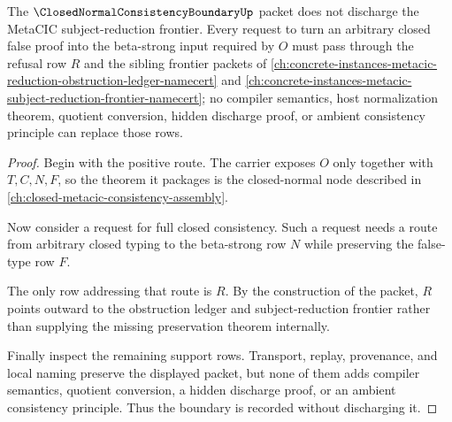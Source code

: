 \begin{theorem}
\label{thm:closed-normal-consistency-boundary-non-discharge}
The $\ClosedNormalConsistencyBoundaryUp$ packet does not discharge the MetaCIC subject-reduction frontier. Every request to turn an arbitrary closed false proof into the beta-strong input required by $O$ must pass through the refusal row $R$ and the sibling frontier packets of \autoref{ch:concrete-instances-metacic-reduction-obstruction-ledger-namecert} and \autoref{ch:concrete-instances-metacic-subject-reduction-frontier-namecert}; no compiler semantics, host normalization theorem, quotient conversion, hidden discharge proof, or ambient consistency principle can replace those rows.
\end{theorem}
\begin{proof}
Begin with the positive route. The carrier exposes $O$ only together with $T,C,N,F$, so the theorem it packages is the closed-normal node described in \autoref{ch:closed-metacic-consistency-assembly}.

Now consider a request for full closed consistency. Such a request needs a route from arbitrary closed typing to the beta-strong row $N$ while preserving the false-type row $F$.

The only row addressing that route is $R$. By the construction of the packet, $R$ points outward to the obstruction ledger and subject-reduction frontier rather than supplying the missing preservation theorem internally.

Finally inspect the remaining support rows. Transport, replay, provenance, and local naming preserve the displayed packet, but none of them adds compiler semantics, quotient conversion, a hidden discharge proof, or an ambient consistency principle. Thus the boundary is recorded without discharging it.
\end{proof}


\begin{closurestatus}{\ClosedNormalConsistencyBoundaryUp}
  \theoryclosure{\seedClosure}
  \formalstatus{\unformalizedV}
\end{closurestatus}
